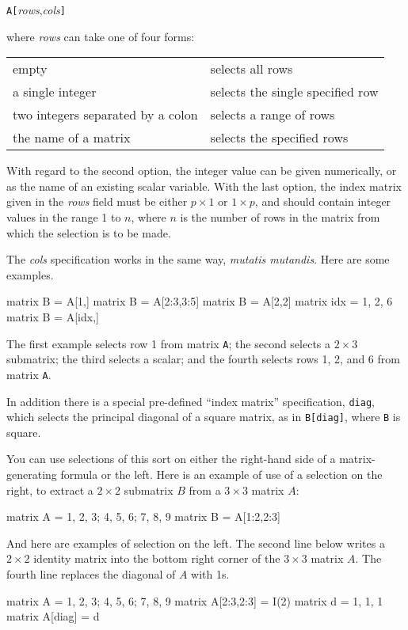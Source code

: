 \texttt{A[}\textsl{rows},\textsl{cols}\texttt{]}

where \textsl{rows} can take one of four forms:

\begin{center}
\begin{tabular}{ll}
empty & selects all rows \\
a single integer & selects the single specified row \\
two integers separated by a colon & selects a range of rows \\
the name of a matrix & selects the specified rows \\
\end{tabular}
\end{center}

With regard to the second option, the integer value can be given
numerically, or as the name of an existing scalar variable.  With the
last option, the index matrix given in the \textsl{rows} field must be
either $p\times 1$ or $1\times p$, and should contain integer values
in the range 1 to $n$, where $n$ is the number of rows in the matrix
from which the selection is to be made.

The \textsl{cols} specification works in the same way, \textit{mutatis
  mutandis}.  Here are some examples.
%
\begin{code}
matrix B = A[1,]
matrix B = A[2:3,3:5]
matrix B = A[2,2]
matrix idx = { 1, 2, 6 }
matrix B = A[idx,]
\end{code}
%
The first example selects row 1 from matrix \texttt{A}; the second
selects a $2\times 3$ submatrix; the third selects a scalar; and
the fourth selects rows 1, 2, and 6 from matrix \texttt{A}.

In addition there is a special pre-defined ``index matrix''
specification, \texttt{diag}, which selects the principal diagonal of
a square matrix, as in \texttt{B[diag]}, where \texttt{B} is square.

You can use selections of this sort on either the right-hand side of
a matrix-generating formula or the left.  Here is an example of use of
a selection on the right, to extract a $2\times 2$ submatrix $B$ from a
$3\times 3$ matrix $A$:
%
\begin{code}
matrix A = { 1, 2, 3; 4, 5, 6; 7, 8, 9 }
matrix B = A[1:2,2:3]
\end{code}
%
And here are examples of selection on the left.  The second line below
writes a $2\times 2$ identity matrix into the bottom right corner of the
$3\times 3$ matrix $A$.  The fourth line replaces the diagonal of $A$ 
with 1s.
%
\begin{code}
matrix A = { 1, 2, 3; 4, 5, 6; 7, 8, 9 }
matrix A[2:3,2:3] = I(2)
matrix d = { 1, 1, 1 }
matrix A[diag] = d
\end{code}

